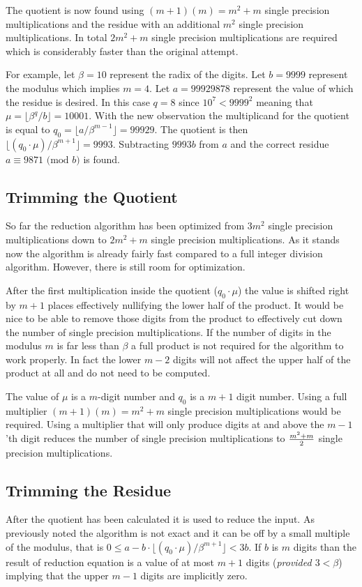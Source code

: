 \documentclass[b5paper]{book}
\begin{document}
The quotient is now found using $(m + 1)(m) = m^2 + m$ single precision multiplications and the residue with an additional $m^2$ single
precision multiplications.  In total $2m^2 + m$ single precision multiplications are required which is considerably faster than the original
attempt.

For example, let $\beta = 10$ represent the radix of the digits.  Let $b = 9999$ represent the modulus which implies $m = 4$. Let $a = 99929878$ 
represent the value of which the residue is desired.  In this case $q = 8$ since $10^7 < 9999^2$ meaning that $\mu = \lfloor \beta^{q}/b \rfloor = 10001$.  
With the new observation the multiplicand for the quotient is equal to $q_0 = \lfloor a / \beta^{m - 1} \rfloor = 99929$.  The quotient is then 
$\lfloor (q_0 \cdot \mu) / \beta^{m+1} \rfloor = 9993$.  Subtracting $9993b$ from $a$ and the correct residue $a \equiv 9871 \mbox{ (mod }b\mbox{)}$ 
is found.  

\subsection{Trimming the Quotient}
So far the reduction algorithm has been optimized from $3m^2$ single precision multiplications down to $2m^2 + m$ single precision multiplications.  As 
it stands now the algorithm is already fairly fast compared to a full integer division algorithm.  However, there is still room for
optimization.  

After the first multiplication inside the quotient ($q_0 \cdot \mu$) the value is shifted right by $m + 1$ places effectively nullifying the lower
half of the product.  It would be nice to be able to remove those digits from the product to effectively cut down the number of single precision 
multiplications.  If the number of digits in the modulus $m$ is far less than $\beta$ a full product is not required for the algorithm to work properly.  
In fact the lower $m - 2$ digits will not affect the upper half of the product at all and do not need to be computed.  

The value of $\mu$ is a $m$-digit number and $q_0$ is a $m + 1$ digit number.  Using a full multiplier $(m + 1)(m) = m^2 + m$ single precision
multiplications would be required.  Using a multiplier that will only produce digits at and above the $m - 1$'th digit reduces the number
of single precision multiplications to ${m^2 + m} \over 2$ single precision multiplications.  

\subsection{Trimming the Residue}
After the quotient has been calculated it is used to reduce the input.  As previously noted the algorithm is not exact and it can be off by a small
multiple of the modulus, that is $0 \le a - b \cdot \lfloor (q_0 \cdot \mu) / \beta^{m+1} \rfloor < 3b$.  If $b$ is $m$ digits than the 
result of reduction equation is a value of at most $m + 1$ digits (\textit{provided $3 < \beta$}) implying that the upper $m - 1$ digits are
implicitly zero.  
\end{document}
